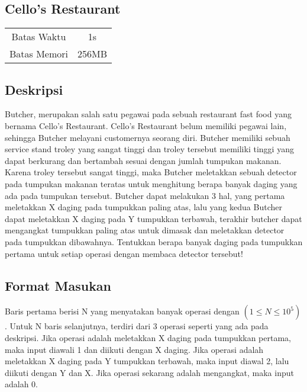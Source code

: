 \documentclass{article}
\begin{document}
\begin{center}
    \section*{Cello's Restaurant} %

    \begin{tabular}{ | c c | }
        \hline
        Batas Waktu  & 1s \\    %
        Batas Memori & 256MB \\  %
        \hline
    \end{tabular}
\end{center}

\subsection*{Deskripsi}
Butcher, merupakan salah satu pegawai pada sebuah restaurant fast food yang bernama Cello's Restaurant. Cello's Restaurant belum memiliki pegawai lain, sehingga Butcher melayani customernya seorang diri. Butcher memiliki sebuah service stand troley yang sangat tinggi dan troley tersebut memiliki tinggi yang dapat berkurang dan bertambah sesuai dengan jumlah tumpukan makanan. Karena troley tersebut sangat tinggi, maka Butcher meletakkan sebuah detector pada  tumpukan makanan teratas untuk menghitung berapa banyak daging yang ada pada tumpukan tersebut. Butcher dapat melakukan 3 hal, yang pertama meletakkan X daging pada tumpukkan paling atas, lalu yang kedua Butcher dapat meletakkan X daging pada Y tumpukkan terbawah, terakhir butcher dapat mengangkat tumpukkan paling atas untuk dimasak dan meletakkan detector pada tumpukkan dibawahnya. Tentukkan berapa banyak daging pada tumpukkan pertama untuk setiap operasi dengan membaca detector tersebut!

\subsection*{Format Masukan}
Baris pertama berisi N yang menyatakan banyak operasi dengan $(1 \leq N  \leq 10^5)$. 
Untuk N baris selanjutnya, terdiri dari 3 operasi seperti yang ada pada deskripsi. Jika operasi adalah meletakkan X daging pada tumpukkan pertama, maka input diawali 1 dan diikuti dengan X daging. Jika operasi adalah meletakkan X daging pada Y tumpukkan terbawah, maka input diawal 2, lalu diikuti dengan Y dan X. Jika operasi sekarang adalah mengangkat, maka input adalah 0.
\end{document}
